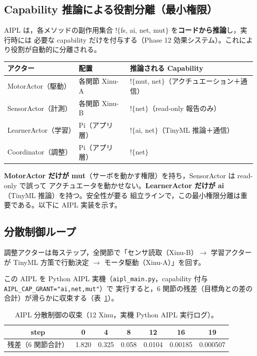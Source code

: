 \documentclass[11pt,a4paper]{ltjsarticle}
\begin{document}
\subsection{Capability 推論による役割分離（最小権限）}
AIPL は，各メソッドの副作用集合 $!\{$fs, ai, net, mut$\}$ を\textbf{コードから推論}し，実行時には
必要な capability だけを付与する（Phase 12 効果システム）。これにより役割が自動的に分離される。
\begin{center}\small
\begin{tabular}{@{}lll@{}}\toprule
アクター & 配置 & 推論される Capability \\\midrule
MotorActor（駆動） & 各関節 Xinu-A & $!\{$mut, net$\}$（アクチュエーション＋通信）\\
SensorActor（計測） & 各関節 Xinu-B & $!\{$net$\}$（read-only 報告のみ）\\
LearnerActor（学習） & Pi（アプリ層）& $!\{$ai, net$\}$（TinyML 推論＋通信）\\
Coordinator（調整） & Pi（アプリ層）& $!\{$net$\}$ \\\bottomrule
\end{tabular}\end{center}
\textbf{MotorActor だけが mut}（サーボを動かす権限）を持ち，SensorActor は read-only で誤って
アクチュエータを動かせない。\textbf{LearnerActor だけが ai}（TinyML 推論）を持つ。安全性が要る
組立ラインで，この最小権限分離は重要である。以下に AIPL 実装を示す。



\subsection{分散制御ループ}
調整アクターは毎ステップ，全関節で「センサ読取（Xinu-B）$\to$ 学習アクターが TinyML 方策で行動決定
$\to$ モータ駆動（Xinu-A）」を回す。



この AIPL を Python AIPL 実機（\texttt{aipl\_main.py}，capability 付与 \texttt{AIPL\_CAP\_GRANT="ai,net,mut"}）で
実行すると，6 関節の残差（目標角との差の合計）が滑らかに収束する（表~\ref{tab:conv}）。

\begin{table}[htbp]\centering\small
\caption{AIPL 分散制御の収束（12 Xinu，実機 Python AIPL 実行ログ）。}
\label{tab:conv}
\begin{tabular}{c|cccccc}\toprule
step & 0 & 4 & 8 & 12 & 16 & 19 \\\midrule
残差（6 関節合計）& 1.820 & 0.325 & 0.058 & 0.0104 & 0.00185 & 0.000507 \\\bottomrule
\end{tabular}
\end{table}
\end{document}
